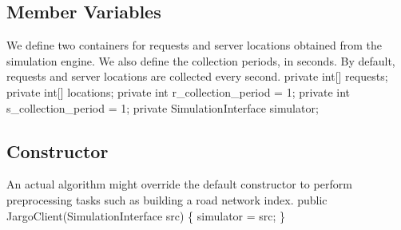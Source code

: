 \documentclass{article}
\def\nwendcode{\endtrivlist \endgroup}
\let\nwdocspar=\par
\begin{document}
\subsection{Member Variables}
We define two containers for requests and server locations obtained from the
simulation engine. We also define the collection periods, in seconds. By
default, requests and server locations are collected every second.
\nwenddocs{}\endmoddef{}
private int[] requests;
private int[] locations;
private int r_collection_period = 1;
private int s_collection_period = 1;
private SimulationInterface simulator;
\eatline
{}\nwendcode{}\nwdocspar
\subsection{Constructor}
An actual algorithm might override the default constructor to perform
preprocessing tasks such as building a road network index.
\nwenddocs{}\endmoddef{}
public JargoClient(SimulationInterface src) \{
  simulator = src;
\}
\nwendcode{}\nwdocspar
\end{document}
